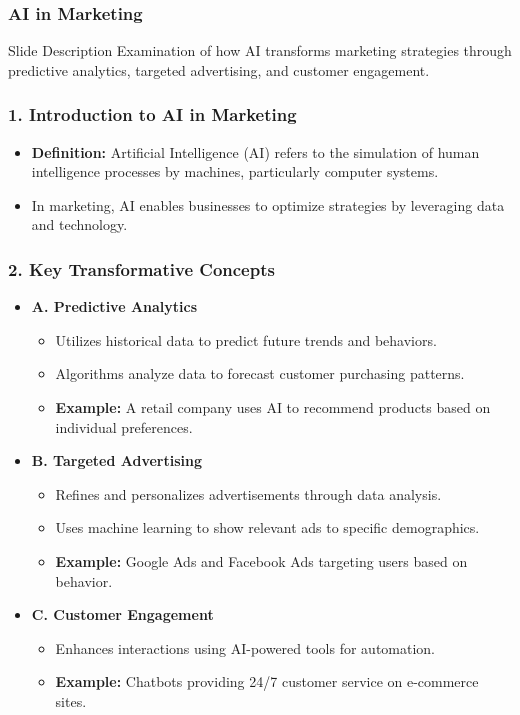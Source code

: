 \documentclass{beamer}
\begin{document}
\begin{frame}[fragile]
    \frametitle{AI in Marketing}
    
    \begin{block}{Slide Description}
        Examination of how AI transforms marketing strategies through predictive analytics, targeted advertising, and customer engagement.
    \end{block}
\end{frame}

\begin{frame}[fragile]
    \frametitle{1. Introduction to AI in Marketing}
    
    \begin{itemize}
        \item \textbf{Definition:} Artificial Intelligence (AI) refers to the simulation of human intelligence processes by machines, particularly computer systems.
        \item In marketing, AI enables businesses to optimize strategies by leveraging data and technology.
    \end{itemize}
\end{frame}

\begin{frame}[fragile]
    \frametitle{2. Key Transformative Concepts}
    
    \begin{itemize}
        \item \textbf{A. Predictive Analytics}
        \begin{itemize}
            \item Utilizes historical data to predict future trends and behaviors.
            \item Algorithms analyze data to forecast customer purchasing patterns.
            \item \textbf{Example:} A retail company uses AI to recommend products based on individual preferences.
        \end{itemize}
        
        \item \textbf{B. Targeted Advertising}
        \begin{itemize}
            \item Refines and personalizes advertisements through data analysis.
            \item Uses machine learning to show relevant ads to specific demographics.
            \item \textbf{Example:} Google Ads and Facebook Ads targeting users based on behavior.
        \end{itemize}
        
        \item \textbf{C. Customer Engagement}
        \begin{itemize}
            \item Enhances interactions using AI-powered tools for automation.
            \item \textbf{Example:} Chatbots providing 24/7 customer service on e-commerce sites.
        \end{itemize}
    \end{itemize}
\end{frame}
\end{document}
